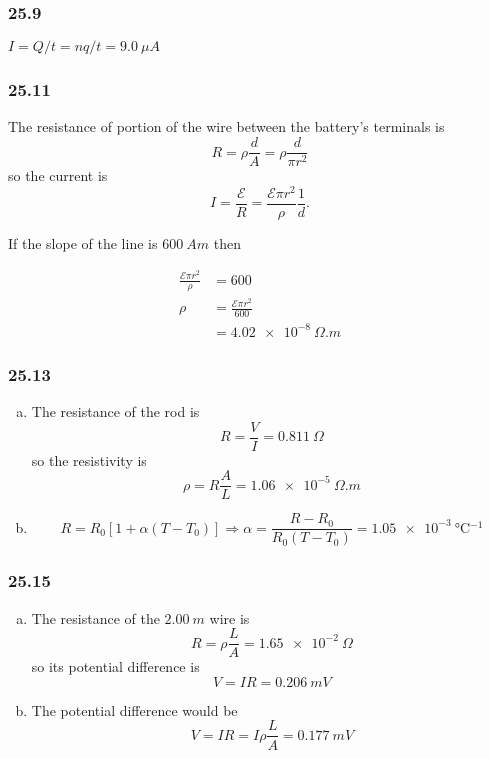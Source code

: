 \documentclass{article}
\begin{document}
\subsubsection{25.9}

$I = Q / t = n q / t = \qty{9.0}{\mu A}$

\subsubsection{25.11}

The resistance of portion of the wire between the battery's terminals is \[R = \rho \frac{d}{A} = \rho \frac{d}{\pi r^2}\] so the current is \[I = \frac{\mathcal{E}}{R} = \frac{\mathcal{E} \pi r^2}{\rho} \frac{1}{d}.\]

If the slope of the line is $\qty{600}{A m}$ then

\begin{align*}
  \frac{\mathcal{E} \pi r^2}{\rho} & = 600                             \\
  \rho                             & = \frac{\mathcal{E} \pi r^2}{600} \\
                                   & = \qty{4.02e-8}{\Omega.m}
\end{align*}

\subsubsection{25.13}

\begin{enumerate}[(a)]
  \item The resistance of the rod is \[R = \frac{V}{I} = \qty{0.811}{\Omega}\] so the resistivity is \[\rho = R \frac{A}{L} = \qty{1.06e-5}{\Omega.m}\]

  \item \[R = R_0 [1 + \alpha (T - T_0)] \Rightarrow \alpha = \frac{R - R_0}{R_0 (T - T_0)} = \qty{1.05e-3}{\degreeCelsius^{-1}}\]
\end{enumerate}

\subsubsection{25.15}

\begin{enumerate}[(a)]
  \item The resistance of the $\qty{2.00}{m}$ wire is \[R = \rho \frac{L}{A} = \qty{1.65e-2}{\Omega}\] so its potential difference is \[V = I R = \qty{0.206}{mV}\]

  \item The potential difference would be \[V = I R = I \rho \frac{L}{A} = \qty{0.177}{mV}\]
\end{enumerate}
\end{document}
